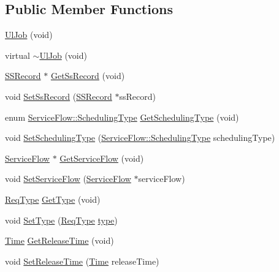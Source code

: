 \subsection*{Public Member Functions}
\begin{DoxyCompactItemize}
\item 
\hyperlink{classns3_1_1UlJob_a7888b9c0ec861540f25c7a2762327d74}{Ul\+Job} (void)
\item 
virtual \hyperlink{classns3_1_1UlJob_ad0204e244addb43171da78a4a31418fc}{$\sim$\+Ul\+Job} (void)
\item 
\hyperlink{classns3_1_1SSRecord}{S\+S\+Record} $\ast$ \hyperlink{classns3_1_1UlJob_adc8f4fac95ea6ca34e6ed4b4a38c35a9}{Get\+Ss\+Record} (void)
\item 
void \hyperlink{classns3_1_1UlJob_a32910ba9e117dcef6c3856cc290ab3c6}{Set\+Ss\+Record} (\hyperlink{classns3_1_1SSRecord}{S\+S\+Record} $\ast$ss\+Record)
\item 
enum \hyperlink{classns3_1_1ServiceFlow_a7990ba10be1e098328fd1e6382a26235}{Service\+Flow\+::\+Scheduling\+Type} \hyperlink{classns3_1_1UlJob_affb2540a38e4b9b6a4def65f888bb1e2}{Get\+Scheduling\+Type} (void)
\item 
void \hyperlink{classns3_1_1UlJob_a8c51977809273a489abc888ec8abb481}{Set\+Scheduling\+Type} (\hyperlink{classns3_1_1ServiceFlow_a7990ba10be1e098328fd1e6382a26235}{Service\+Flow\+::\+Scheduling\+Type} scheduling\+Type)
\item 
\hyperlink{classns3_1_1ServiceFlow}{Service\+Flow} $\ast$ \hyperlink{classns3_1_1UlJob_ac977ce7fd5455b19befdd1240d76c3d4}{Get\+Service\+Flow} (void)
\item 
void \hyperlink{classns3_1_1UlJob_a2b31abd68c3fe31e8564af075d83ba48}{Set\+Service\+Flow} (\hyperlink{classns3_1_1ServiceFlow}{Service\+Flow} $\ast$service\+Flow)
\item 
\hyperlink{namespacens3_a534f9a14e4d9aeb5b400e61f152a73a2}{Req\+Type} \hyperlink{classns3_1_1UlJob_a86f8c8d34badc8c8ecf34be8868c0222}{Get\+Type} (void)
\item 
void \hyperlink{classns3_1_1UlJob_a9346237f6e53a7c65c7de695f4a0f7b1}{Set\+Type} (\hyperlink{namespacens3_a534f9a14e4d9aeb5b400e61f152a73a2}{Req\+Type} \hyperlink{visualizer-ideas_8txt_add98db9e15e2a58cf2b57623e7aa893a}{type})
\item 
\hyperlink{classns3_1_1Time}{Time} \hyperlink{classns3_1_1UlJob_a4b32c4d6163265044e7063b07c91b5ad}{Get\+Release\+Time} (void)
\item 
void \hyperlink{classns3_1_1UlJob_a85f26fef3ee28e8464806b1e5c765b06}{Set\+Release\+Time} (\hyperlink{classns3_1_1Time}{Time} release\+Time)

\end{DoxyCompactItemize}
